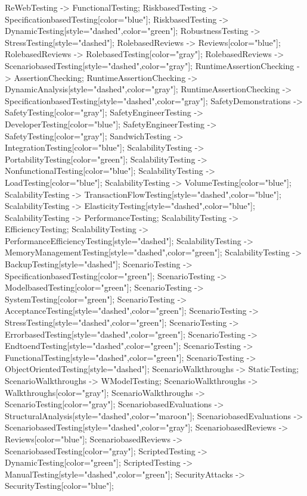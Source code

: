 \documentclass{article}
\begin{document}
{ReWebTesting -> FunctionalTesting;
RiskbasedTesting -> SpecificationbasedTesting[color="blue"];
RiskbasedTesting -> DynamicTesting[style="dashed",color="green"];
RobustnessTesting -> StressTesting[style="dashed"];
RolebasedReviews -> Reviews[color="blue"];
RolebasedReviews -> RolebasedTesting[color="gray"];
RolebasedReviews -> ScenariobasedTesting[style="dashed",color="gray"];
RuntimeAssertionChecking -> AssertionChecking;
RuntimeAssertionChecking -> DynamicAnalysis[style="dashed",color="gray"];
RuntimeAssertionChecking -> SpecificationbasedTesting[style="dashed",color="gray"];
SafetyDemonstrations -> SafetyTesting[color="gray"];
SafetyEngineerTesting -> DeveloperTesting[color="blue"];
SafetyEngineerTesting -> SafetyTesting[color="gray"];
SandwichTesting -> IntegrationTesting[color="blue"];
ScalabilityTesting -> PortabilityTesting[color="green"];
ScalabilityTesting -> NonfunctionalTesting[color="blue"];
ScalabilityTesting -> LoadTesting[color="blue"];
ScalabilityTesting -> VolumeTesting[color="blue"];
ScalabilityTesting -> TransactionFlowTesting[style="dashed",color="blue"];
ScalabilityTesting -> ElasticityTesting[style="dashed",color="blue"];
ScalabilityTesting -> PerformanceTesting;
ScalabilityTesting -> EfficiencyTesting;
ScalabilityTesting -> PerformanceEfficiencyTesting[style="dashed"];
ScalabilityTesting -> MemoryManagementTesting[style="dashed",color="green"];
ScalabilityTesting -> BackupTesting[style="dashed"];
ScenarioTesting -> SpecificationbasedTesting[color="green"];
ScenarioTesting -> ModelbasedTesting[color="green"];
ScenarioTesting -> SystemTesting[color="green"];
ScenarioTesting -> AcceptanceTesting[style="dashed",color="green"];
ScenarioTesting -> StressTesting[style="dashed",color="green"];
ScenarioTesting -> ErrorbasedTesting[style="dashed",color="green"];
ScenarioTesting -> EndtoendTesting[style="dashed",color="green"];
ScenarioTesting -> FunctionalTesting[style="dashed",color="green"];
ScenarioTesting -> ObjectOrientedTesting[style="dashed"];
ScenarioWalkthroughs -> StaticTesting;
ScenarioWalkthroughs -> WModelTesting;
ScenarioWalkthroughs -> Walkthroughs[color="gray"];
ScenarioWalkthroughs -> ScenarioTesting[color="gray"];
ScenariobasedEvaluations -> StructuralAnalysis[style="dashed",color="maroon"];
ScenariobasedEvaluations -> ScenariobasedTesting[style="dashed",color="gray"];
ScenariobasedReviews -> Reviews[color="blue"];
ScenariobasedReviews -> ScenariobasedTesting[color="gray"];
ScriptedTesting -> DynamicTesting[color="green"];
ScriptedTesting -> ManualTesting[style="dashed",color="green"];
SecurityAttacks -> SecurityTesting[color="blue"];
}
\end{document}
